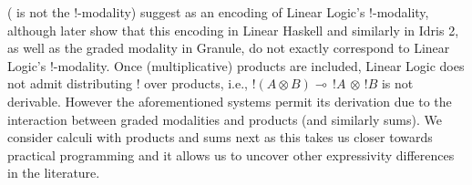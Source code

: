 \begin{remark}
( is not the $!$-modality)
\citet{DBLP:journals/pacmpl/BernardyBNJS18} suggest  as
an encoding of Linear Logic's $!$-modality, although \citet{hughes2021linear} later show that this
encoding in Linear Haskell and similarly in Idris 2, as well as the graded modality in Granule, do not exactly correspond to Linear Logic's $!$-modality. Once (multiplicative) products
are included, Linear Logic does not admit distributing $!$ over products, i.e.,
$!(A \otimes B) \multimap \,! A\, \otimes \,! B$ is not derivable. However the aforementioned systems permit its derivation due to the interaction between graded modalities and products
(and similarly sums). We consider calculi with products and sums next
as this takes us closer towards practical programming and it allows us to uncover
other expressivity differences in the literature.
\end{remark}
